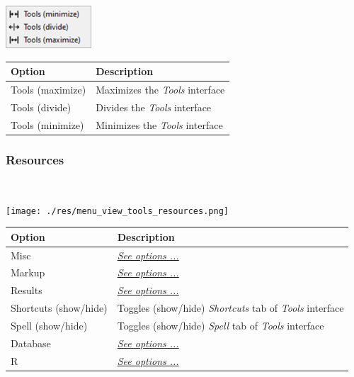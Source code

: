 \includegraphics[scale=0.50]{./res/menu_view_tools_size.png}\\

\begin{scriptsize}
  \begin{tabularx}{\textwidth}{>{\hsize=0.3\hsize}X>{\hsize=0.7\hsize}X}\\
    \hline
    \textbf{Option} & \textbf{Description} \\
    \hline
    Tools (maximize) & Maximizes the \textit{Tools} interface \\
    Tools (divide) & Divides the \textit{Tools} interface \\
    Tools (minimize) & Minimizes the \textit{Tools} interface \\
    \hline
  \end{tabularx}
\end{scriptsize}


\hypertarget{menu_view_tools_resources}{}
\subsubsection{Resources}\\

\texttt{[image: ./res/menu\_view\_tools\_resources.png]}\\

\begin{scriptsize}
  \begin{tabularx}{\textwidth}{>{\hsize=0.4\hsize}X>{\hsize=0.7\hsize}X}\\
    \hline
    \textbf{Option} & \textbf{Description} \\
    \hline
    Misc & \textit{\href{\#menu\_view\_tools\_resources\_misc}{See options ...}} \\
    Markup & \textit{\href{\#menu\_view\_tools\_resources\_markup}{See options ...}} \\
    Results & \textit{\href{\#menu\_view\_tools\_resources\_results}{See options ...}} \\
    Shortcuts (show/hide) & Toggles (show/hide) \textit{Shortcuts} tab of \textit{Tools} interface \\
    Spell (show/hide) & Toggles (show/hide) \textit{Spell} tab of \textit{Tools} interface \\
    Database & \textit{\href{\#menu\_view\_tools\_resources\_database}{See options ...}} \\
    R & \textit{\href{\#menu\_view\_tools\_resources\_r}{See options ...}} \\
    \hline
  \end{tabularx}
\end{scriptsize}


